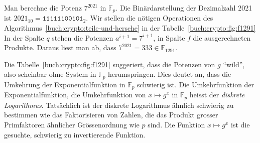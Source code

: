 \begin{beispiel}
Man berechne die Potenz $7^{2021}$ in $\mathbb{F}_p$.
Die Binärdarstellung der Dezimalzahl 2021 ist
$2021_{10}=\texttt{11111100101}_2$.
Wir stellen die nötigen Operationen des
Algorithmus~\ref{buch:crypto:teile-und-hersche} in der 
Tabelle~\ref{buch:crypto:fig:f1291}
In der Spalte $q$ stehen die Potenzen $a^{i+1}=7^{i+1}$, in Spalte $f$ die
ausgerechneten Produkte.
Daraus liest man ab, dass $7^{2021}=333\in\mathbb{F}_{1291}$.
\end{beispiel}

Die Tabelle~\ref{buch:crypto:fig:f1291} suggeriert, dass die Potenzen von $g$
``wild'', also scheinbar ohne System in $\mathbb{F}_p$ herumspringen.
Dies deutet an, dass die Umkehrung der Exponentialfunktion in $\mathbb{F}_p$
schwierig ist.
Die Umkehrfunktion der Exponentialfunktion, die Umkehrfunktion von 
$x\mapsto g^x$ in $\mathbb{F}_p$ heisst der {\em diskrete Logarithmus}.
%
Tatsächlich ist der diskrete Logarithmus ähnlich schwierig zu bestimmen
wie das Faktorisieren von Zahlen, die das Produkt grosser
Primfaktoren ähnlicher Grössenordnung wie $p$ sind.
Die Funktion $x\mapsto g^x$ ist die gesuchte, schwierig zu invertierende
Funktion.

%

